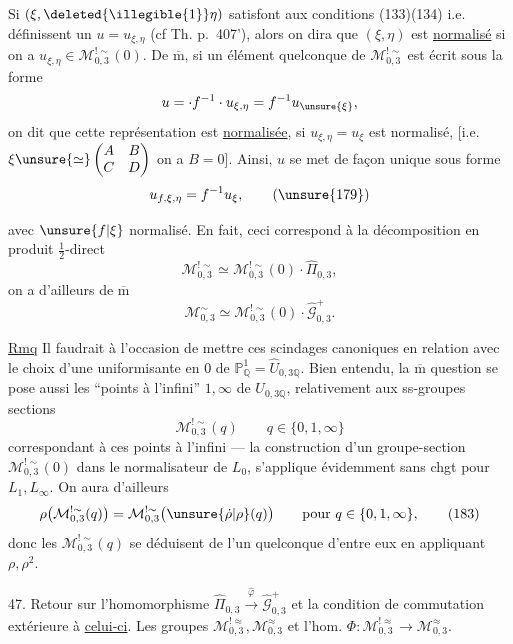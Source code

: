 Si $(\xi,\deleted{\illegible{1}}\eta)$ satisfont aux conditions (133)(134) i.e. définissent un $u=u_{\xi,\eta}$ (cf Th. p.~407'), alors on dira que $(\xi,\eta)$ est \uline{normalisé} si on a $u_{\xi,\eta}\in\mathcal M_{0,3}^{!\sim}(0)$. De $\overline{\mathrm m}$, si un élément quelconque de $\mathcal M_{0,3}^{!\sim}$ est écrit sous la forme
\[
u=\cdot f^{-1}\cdot u_{\xi,\eta}=f^{-1}u_{\unsure{\xi}},
\]
on dit que cette représentation  est \uline{normalisée}, si $u_{\xi,\eta}=u_\xi$ est normalisé, [i.e.   $\xi\unsure{\simeq}\begin{pmatrix}A&B\\C&D\end{pmatrix}$  on a $B=0$]. Ainsi,  $u$ se met de façon unique sous forme
\[
u_{f,\xi,\eta}=f^{-1}u_\xi,
\tag{\unsure{179}}
\]

avec $\unsure{f|\xi}$ normalisé. En fait, ceci correspond à la décomposition en produit $\frac12$-direct
\[
\mathcal M_{0,3}^{!\sim}\simeq\mathcal M_{0,3}^{!\sim}(0)\cdot\widehat\Pi_{0,3},
\tag{180}
\]
on a d'ailleurs de $\overline{\mathrm m}$
\[
\mathcal M_{0,3}^{\sim}\simeq\mathcal M_{0,3}^{!\sim}(0)\cdot\widehat{\mathcal G}_{0,3}^{+}.
\tag{181}
\]

\uline{Rmq} Il faudrait à l'occasion  de mettre ces scindages canoniques en relation avec le choix d'une uniformisante en $0$ de $\mathbb P^1_{\mathbb Q}=\widehat U_{0,3\mathbb Q}$. Bien entendu, la $\overline{\mathrm m}$ question se pose aussi  les  ``points à l'infini'' $1,\infty$ de $U_{0,3\mathbb Q}$, relativement aux ss-groupes sections
\[
\mathcal M_{0,3}^{!\sim}(q)\qquad q\in\{0,1,\infty\}
\tag{182}
\]
correspondant à ces points à l'infini --- la construction d'un groupe-section $\mathcal M_{0,3}^{!\sim}(0)$ dans le normalisateur de $L_0$, s'applique évidemment sans chgt pour $L_1,L_\infty$. On aura d'ailleurs
\[
\rho\bigl(\mathcal M_{0,3}^{!\sim}(q)\bigr)=\mathcal M_{0,3}^{!\sim}\bigl(\unsure{\dot\rho|\rho}(q)\bigr)\qquad\text{pour }q\in\{0,1,\infty\},
\tag{183}
\]
donc les  $\mathcal M_{0,3}^{!\sim}(q)$ se déduisent de l'un quelconque d'entre eux en appliquant $\rho,\rho^2$.

47. Retour sur l'homomorphisme $\widehat\Pi_{0,3}\xrightarrow{\widehat\varphi}\widehat{\mathcal G}_{0,3}^{+}$ et la condition de commutation extérieure à \uline{celui-ci}. Les groupes $\mathcal M_{0,3}^{!\approx},\mathcal M_{0,3}^{\approx}$ et l'hom. $\Phi:\mathcal M_{0,3}^{!\approx}\longrightarrow\mathcal M_{0,3}^{\approx}$.

